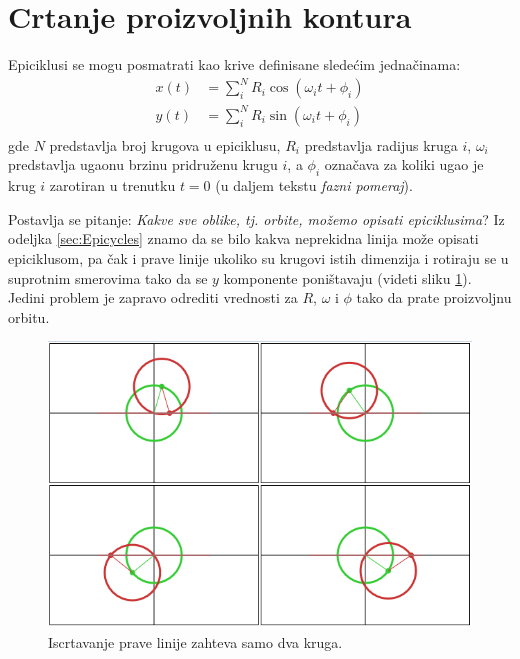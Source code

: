 \section{Crtanje proizvoljnih kontura}
\label{sec:Drawing}

Epiciklusi se mogu posmatrati kao krive definisane slede\'c{}im jedna\v{c}inama:
\begin{equation}
\begin{aligned} 
    x(t) & = \sum_i^N R_i\cos(\omega_i t + \phi_i)\\ 
    y(t) & = \sum_i^N R_i\sin(\omega_i t + \phi_i)\\ 
\end{aligned}
\label{eq:ep}
\end{equation}
gde $N$ predstavlja broj krugova u epiciklusu, $R_i$ predstavlja radijus kruga $i$, $\omega_i$ predstavlja ugaonu brzinu pridru\v{z}enu krugu $i$, a $\phi_i$ ozna\v{c}ava za koliki ugao je krug $i$ zarotiran u trenutku $t = 0$ (u daljem tekstu \emph{fazni pomeraj}).

Postavlja se pitanje: \emph{Kakve sve oblike, tj. orbite, mo\v{z}emo opisati epiciklusima}? Iz odeljka \ref{sec:Epicycles} znamo da se bilo kakva neprekidna linija mo\v{z}e opisati epiciklusom, pa \v{c}ak i prave linije ukoliko su krugovi istih dimenzija i rotiraju se u suprotnim smerovima tako da se $y$ komponente poni\v{s}tavaju (videti sliku \ref{img:line}). Jedini problem je zapravo odrediti vrednosti za $R$, $\omega$ i $\phi$ tako da prate proizvoljnu orbitu.

\begin{figure}
    \centering
    \includegraphics[scale=0.7]{images/line.PNG}
    \caption{Iscrtavanje prave linije zahteva samo dva kruga.}
    \label{img:line}
\end{figure}


